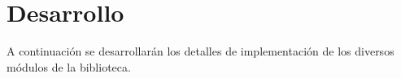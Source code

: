\chapter{Desarrollo}
A continuación se desarrollarán los detalles de implementación de los diversos módulos de la biblioteca.




